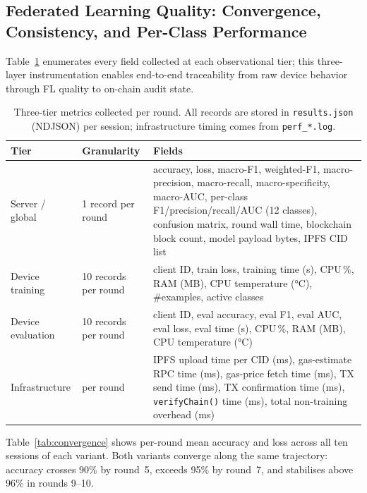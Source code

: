 \documentclass{llncs}
\begin{document}
\subsection{Federated Learning Quality: Convergence, Consistency, and Per-Class Performance}
\label{subsec:flquality}

Table~\ref{tab:metrics} enumerates every field collected at each observational tier;
this three-layer instrumentation enables end-to-end traceability from raw
device behavior through FL quality to on-chain audit state.

\begin{table}[t]
\caption{Three-tier metrics collected per round. All records are stored in
  \texttt{results.json} (NDJSON) per session; infrastructure timing comes
  from \texttt{perf\_*.log}.}
\label{tab:metrics}
\centering\footnotesize
\setlength{\tabcolsep}{3pt}
\begin{tabular}{llp{6.3cm}}
\toprule
\textbf{Tier} & \textbf{Granularity} & \textbf{Fields} \\
\midrule
Server / global & 1 record per round
  & accuracy, loss, macro-F1, weighted-F1, macro-precision,
    macro-recall, macro-specificity, macro-AUC,
    per-class F1/precision/recall/AUC (12 classes),
    confusion matrix, round wall time, blockchain block count,
    model payload bytes, IPFS CID list \\
\midrule
Device training & 10 records per round
  & client ID, train loss, training time (s), CPU\,\%,
    RAM (MB), CPU temperature (°C), \#examples, active classes \\
\midrule
Device evaluation & 10 records per round
  & client ID, eval accuracy, eval F1, eval AUC, eval loss,
    eval time (s), CPU\,\%, RAM (MB), CPU temperature (°C) \\
\midrule
Infrastructure & per round
  & IPFS upload time per CID (ms), gas-estimate RPC time (ms),
    gas-price fetch time (ms), TX send time (ms),
    TX confirmation time (ms), \texttt{verifyChain()} time (ms),
    total non-training overhead (ms) \\
\bottomrule
\end{tabular}
\end{table}

Table~\ref{tab:convergence} shows per-round mean accuracy and loss across
all ten sessions of each variant. Both variants converge along the same
trajectory: accuracy crosses 90\% by round~5, exceeds 95\% by round~7,
and stabilises above 96\% in rounds 9--10.
\end{document}
